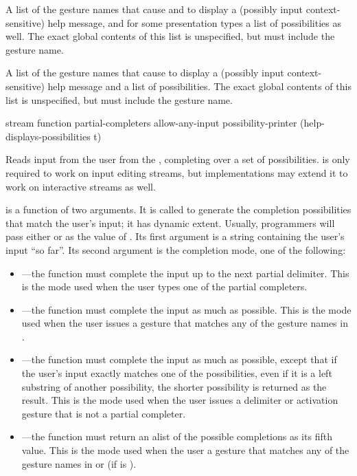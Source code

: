 
A list of the gesture names that cause  and  to
display a (possibly input context-sensitive) help message, and for some
presentation types a list of possibilities as well.  The exact global contents
of this list is unspecified, but must include the  gesture name.


A list of the gesture names that cause  to display a
(possibly input context-sensitive) help message and a list of possibilities.
The exact global contents of this list is unspecified, but must include the
 gesture name.

 {stream function 
                         \key partial-completers allow-any-input
                              possibility-printer (help-displays-possibilities t)}

Reads input from the user from the  ,
completing over a set of possibilities.   is only required to
work on input editing streams, but implementations may extend it to work on
interactive streams as well.

 is a function of two arguments.  It is called to generate the
completion possibilities that match the user's input; it has dynamic extent.
Usually, programmers will pass either  or
 as the value of .  Its first argument
is a string containing the user's input ``so far''.  Its second argument is the
completion mode, one of the following:

\begin{itemize}
\item {}---the function must complete the input up to the
next partial delimiter.  This is the mode used when the user types one of the
partial completers.

\item {}---the function must complete the input as much as
possible.  This is the mode used when the user issues a gesture that matches any
of the gesture names in .

\item {}---the function must complete the input as much as possible,
except that if the user's input exactly matches one of the possibilities, even
if it is a left substring of another possibility, the shorter possibility is
returned as the result.  This is the mode used when the user issues a delimiter
or activation gesture that is not a partial completer.

\item {}---the function must return an alist of the possible
completions as its fifth value.  This is the mode used when the user a gesture
that matches any of the gesture names in  or
 (if  is ).
\end{itemize}

